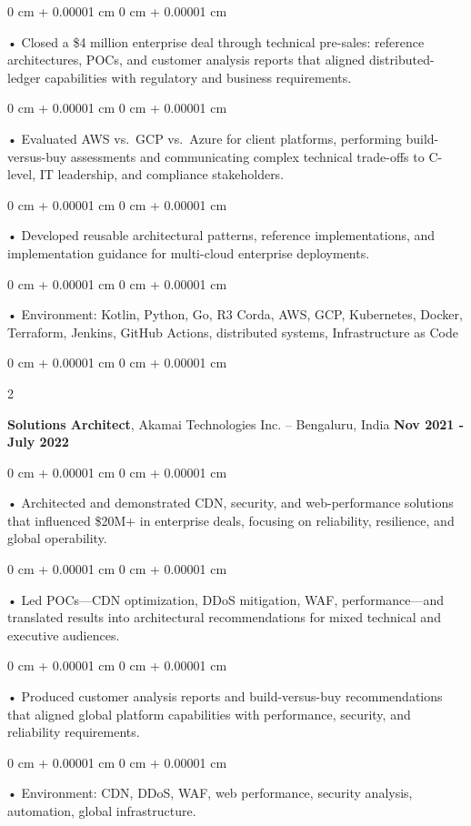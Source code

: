 \documentclass[10pt, letterpaper]{article}
\newenvironment{onecolentry}{
    \begin{adjustwidth}{
        0 cm + 0.00001 cm
    }{
        0 cm + 0.00001 cm
    }
}{
    \end{adjustwidth}
} %
\newenvironment{twocolentry}[2][]{
    \onecolentry
    \def\secondColumn{#2}
    \setcolumnwidth{\fill, 4.5 cm}
    \begin{paracol}{2}
}{
    \switchcolumn \raggedleft \secondColumn
    \end{paracol}
    \endonecolentry
} %
\begin{document}
        \begin{onecolentry}
             • Closed a \$4 million enterprise deal through technical pre-sales: reference architectures, POCs, and customer analysis reports that aligned distributed-ledger capabilities with regulatory and business requirements.
        \end{onecolentry}
        \begin{onecolentry}
             • Evaluated AWS vs.\ GCP vs.\ Azure for client platforms, performing build-versus-buy assessments and communicating complex technical trade-offs to C-level, IT leadership, and compliance stakeholders.
        \end{onecolentry}
        \begin{onecolentry}
             • Developed reusable architectural patterns, reference implementations, and implementation guidance for multi-cloud enterprise deployments.
        \end{onecolentry}

        \begin{onecolentry}
             • Environment: Kotlin, Python, Go, R3 Corda, AWS, GCP, Kubernetes, Docker, Terraform, Jenkins, GitHub Actions, distributed systems, Infrastructure as Code
        \end{onecolentry}
        \vspace{0.1cm}

        \begin{twocolentry}{
            \textbf{Nov 2021 - July 2022}
        }
            \textbf{Solutions Architect}, Akamai Technologies Inc. -- Bengaluru, India \end{twocolentry}
        \begin{onecolentry}
            • Architected and demonstrated CDN, security, and web-performance solutions that influenced \$20M+ in enterprise deals, focusing on reliability, resilience, and global operability.
        \end{onecolentry}
        \begin{onecolentry}
            • Led POCs---CDN optimization, DDoS mitigation, WAF, performance---and translated results into architectural recommendations for mixed technical and executive audiences.
        \end{onecolentry}
        \begin{onecolentry}
             • Produced customer analysis reports and build-versus-buy recommendations that aligned global platform capabilities with performance, security, and reliability requirements.
        \end{onecolentry}
        \begin{onecolentry}
             • Environment: CDN, DDoS, WAF, web performance, security analysis, automation, global infrastructure.
        \end{onecolentry}
\end{document}
